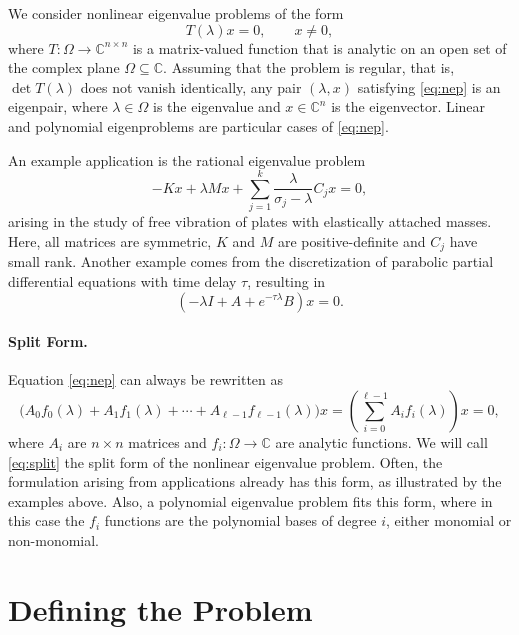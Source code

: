 We consider nonlinear eigenvalue problems of the form
\begin{equation}
T(\lambda)x=0,\qquad x\neq 0,\label{eq:nep}
\end{equation}
where $T:\Omega\rightarrow\mathbb{C}^{n\times n}$ is a matrix-valued function that is analytic on an open set of the complex plane $\Omega\subseteq\mathbb{C}$. Assuming that the problem is regular, that is, $\det T(\lambda)$ does not vanish identically, any pair $(\lambda,x)$ satisfying \eqref{eq:nep} is an eigenpair, where $\lambda\in\Omega$ is the eigenvalue and $x\in\mathbb{C}^n$ is the eigenvector. Linear and polynomial eigenproblems are particular cases of \eqref{eq:nep}.

An example application is the rational eigenvalue problem
\begin{equation}
-Kx+\lambda Mx+\sum_{j=1}^k\frac{\lambda}{\sigma_j-\lambda}C_jx=0,\label{eq:rep}
\end{equation}
arising in the study of free vibration of plates with elastically attached masses. Here, all matrices are symmetric, $K$ and $M$ are positive-definite and $C_j$ have small rank.
Another example comes from the discretization of parabolic partial differential equations with time delay $\tau$, resulting in
\begin{equation}
(-\lambda I + A + e^{-\tau\lambda}B)x = 0.\label{eq:delay}
\end{equation}

\paragraph{Split Form.}
Equation \eqref{eq:nep} can always be rewritten as
\begin{equation}
\big(A_0f_0(\lambda)+A_1f_1(\lambda)+\cdots+A_{\ell-1}f_{\ell-1}(\lambda)\big)x=
\left(\sum_{i=0}^{\ell-1}A_if_i(\lambda)\right)x = 0,\label{eq:split}
\end{equation}
where $A_i$ are $n\times n$ matrices and $f_i:\Omega\rightarrow\mathbb{C}$ are analytic functions. We will call \eqref{eq:split} the split form of the nonlinear eigenvalue problem. Often, the formulation arising from applications already has this form, as illustrated by the examples above. Also, a polynomial eigenvalue problem fits this form, where in this case the $f_i$ functions are the polynomial bases of degree $i$, either monomial or non-monomial.

\section{Defining the Problem}


